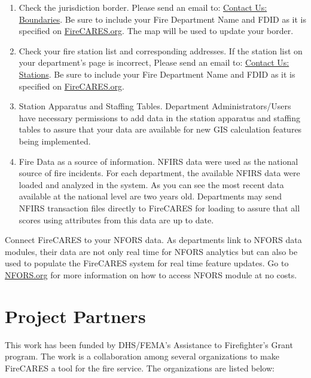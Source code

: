 \documentclass[12pt,oneside]{book}
\begin{document}
\begin{enumerate}
\item Check the jurisdiction border. Please send an email to: \href{mailto:boundaries@firecares.org}{Contact Us: Boundaries}. Be sure to include your Fire Department Name and FDID as it is specified on \href{https://www.FireCARES.org}{FireCARES.org}. The map will be used to update your border.

\item Check your fire station list and corresponding addresses. If the station list on your department's page is incorrect, Please send an email to: \href{mailto:stations@firecares.org}{Contact Us: Stations}. Be sure to include your Fire Department Name and FDID as it is specified on \href{https://www.FireCARES.org}{FireCARES.org}.

\item Station Apparatus and Staffing Tables. Department Administrators/Users have necessary permissions to add data in the station apparatus and staffing tables to assure that your data are available for new GIS calculation features being implemented. 

\item Fire Data as a source of information. NFIRS data were used as the national source of fire incidents. For each department, the available NFIRS data were loaded and analyzed in the system.  As you can see the most recent data available at the national level are two years old. Departments may send NFIRS transaction files directly to FireCARES for loading to assure that all scores using attributes from this data are up to date.  

\end{enumerate}

Connect FireCARES to your NFORS data. As departments link to NFORS data modules, their data are not only real time for NFORS analytics but can also be used to populate the FireCARES system for real time feature updates. Go to \href{https://nfors.org}{NFORS.org} for more information on how to access NFORS module at no costs.

\chapter{Project Partners}

This work has been funded by DHS/FEMA's Assistance to Firefighter's Grant program. The work is a collaboration among several organizations to make FireCARES a tool for the fire service. The organizations are listed below:
\end{document}
